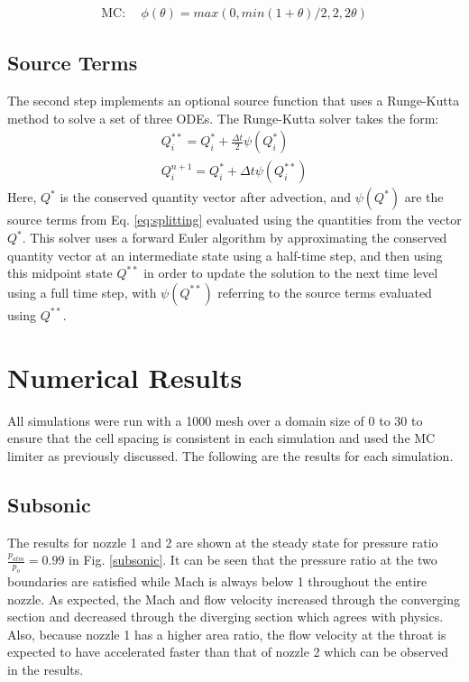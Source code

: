 \documentclass{article}%
\numberwithin{equation}{section}
\begin{document}
\begin{align}
\text{MC:} \ \ & \phi(\theta)=max(0,min(1+\theta)/2,2, 2\theta)
\end{align}

\subsection{Source Terms}
The second step implements an optional source function that uses a Runge-Kutta method to solve a set of three ODEs. The Runge-Kutta solver takes the form:
\begin{equation}
\begin{split}
Q^{**}_i=Q^*_i+\frac{\Delta t}{2} \psi (Q^*_i) \\
Q^{n+1}_i=Q^*_i+ \Delta t \psi(Q^{**}_i)
\end{split}
\end{equation}
Here, $ Q^* $ is the conserved quantity vector after advection, and $ \psi(Q^*) $ are the source terms from Eq. \ref{eq:splitting} evaluated using the quantities from the vector $ Q^* $. This solver uses a forward Euler algorithm by approximating the conserved quantity vector at an intermediate state using a half-time step, and then using this midpoint state $ Q^{**} $ in order to update the solution to the next time level using a full time step, with $ \psi(Q^{**}) $ referring to the source terms evaluated using $ Q^{**} $.

\section{Numerical Results}
All simulations were run with a 1000 mesh over a domain size of 0 to 30 to ensure that the cell spacing is consistent in each simulation and used the MC limiter as previously discussed. The following are the results for each simulation.

\subsection{Subsonic}
The results for nozzle 1 and 2 are shown at the steady state for pressure ratio $\frac{p_{atm}}{p_o} = 0.99$ in Fig. \ref{subsonic}. It can be seen that the pressure ratio at the two boundaries are satisfied while Mach is always below 1 throughout the entire nozzle. As expected, the Mach and flow velocity increased through the converging section and decreased through the diverging section which agrees with physics. Also, because nozzle 1 has a higher area ratio, the flow velocity at the throat is expected to have accelerated faster than that of nozzle 2 which can be observed in the results.
\end{document}

